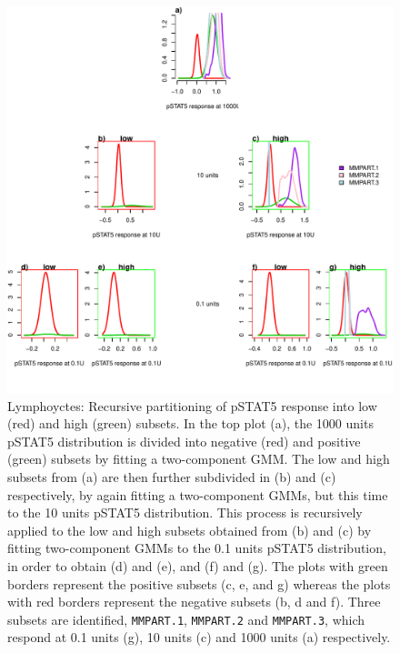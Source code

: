 %
\begin{figure}[!h]
\centering
\includegraphics[scale=.7]{figures/mmpart-lymphocytes-tree}
{ Lymphoyctes: Recursive partitioning of pSTAT5 response into low (red) and high (green) subsets. }
{
    In the top plot (a), the 1000 units pSTAT5 distribution is divided into negative (red) and positive (green) subsets by fitting a two-component \gls{GMM}.
    The low and high subsets from (a) are then further subdivided in (b) and (c) respectively, by again fitting a two-component \glspl{GMM},
    but this time to the 10 units pSTAT5 distribution.
    This process is recursively applied to the low and high subsets obtained from (b) and (c) by fitting two-component \glspl{GMM} to the 0.1 units pSTAT5 distribution, in order
    to obtain (d) and (e), and (f) and (g).
    The plots with green borders represent the positive subsets (c, e, and g) whereas the plots with red borders represent the negative subsets (b, d and f).
    Three subsets are identified, \texttt{MMPART.1}, \texttt{MMPART.2} and \texttt{MMPART.3}, which respond at 0.1 units (g), 10 units (c) and 1000 units (a) respectively.
}
\end{figure}

